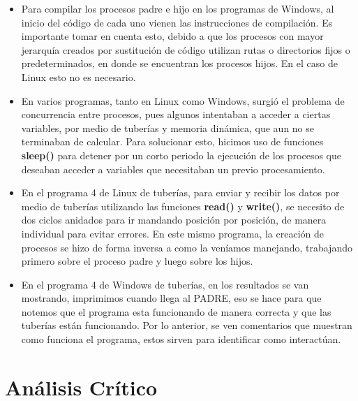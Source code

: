 \documentclass[12pt]{article}
\begin{document}
\begin{itemize}
           \item[\Checkmark] Para compilar los procesos padre e hijo en los programas de Windows, al inicio del código de cada uno vienen las instrucciones de compilación. Es importante tomar en cuenta esto, debido a que los procesos con mayor jerarquía creados por sustitución de código utilizan rutas o directorios fijos o predeterminados, en donde se encuentran los procesos hijos. En el caso de Linux esto no es necesario.
           
           \item[\Checkmark] En varios programas, tanto en Linux como Windows, surgió el problema de concurrencia entre procesos, pues algunos intentaban a acceder a ciertas variables, por medio de tuberías y memoria dinámica, que aun no se terminaban de calcular. Para solucionar esto, hicimos uso de funciones \textbf{sleep()} para detener por un corto periodo la ejecución de los procesos que deseaban acceder a variables que necesitaban un previo procesamiento.
           
           \item[\Checkmark] En el programa 4 de Linux de tuberías, para enviar y recibir los datos por medio de tuberías utilizando las funciones \textbf{read()} y \textbf{write()}, se necesito de dos ciclos anidados para ir mandando posición por posición, de manera individual para evitar errores. En este mismo programa, la creación de procesos se hizo de forma inversa a como la veníamos manejando, trabajando primero sobre el proceso padre y luego sobre los hijos.
           
            \item[\Checkmark] En el programa 4 de Windows de tuberías, en los resultados se van mostrando, imprimimos cuando llega al PADRE, eso se hace para que notemos que el programa esta funcionando de manera correcta y que las tuberías están funcionando. Por lo anterior, se ven comentarios que muestran como funciona el programa, estos sirven para identificar como interactúan.
          
\end{itemize}


  
  \section{Análisis Crítico}
  
\end{document}

